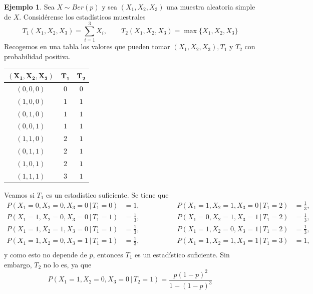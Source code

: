 \documentclass[11pt]{report}
\theoremstyle{definition}
\newtheorem{example}{Ejemplo}
\begin{document}
\begin{example}
Sea $X \sim Ber(p)$ y sea $(X_1,X_2,X_3)$ una muestra aleatoria simple de $X$. Considérense los estadísticos muestrales
\[T_1(X_1,X_2,X_3) = \sum_{i=1}^3 X_i, \qquad T_2(X_1,X_2,X_3) = \max\{X_1,X_2,X_3\}\]
Recogemos en una tabla los valores que pueden tomar $(X_1,X_2,X_3), T_1$ y $T_2$ con probabilidad positiva.

\begin{center}
\begin{tabular}{|c|c|c|}
\hline
     $\bm{(X_1,X_2,X_3)}$ & $\bm{T_1}$ & $\bm{T_2}$  \\ \hline
     $(0,0,0)$ & $0$ & $0$ \\
     $(1,0,0)$ & $1$ & $1$ \\
     $(0,1,0)$ & $1$ & $1$ \\
     $(0,0,1)$ & $1$ & $1$ \\
     $(1,1,0)$ & $2$ & $1$ \\
     $(0,1,1)$ & $2$ & $1$ \\
     $(1,0,1)$ & $2$ & $1$ \\
     $(1,1,1)$ & $3$ & $1$ \\ \hline
\end{tabular}
\end{center}

Veamos si $T_1$ es un estadístico suficiente. Se tiene que
\[
\begin{alignedat}{3}
    P(X_1=0,X_2=0,X_3=0 \, \big| \, T_1 = 0) &= 1,\phantom{\frac{1}{3}} & \qquad \qquad P(X_1=1,X_2=1,X_3=0 \, \big| \, T_1 = 2) &= \frac{1}{3}, \\[5pt]
    P(X_1=1,X_2=0,X_3=0 \, \big| \, T_1 = 1) &= \frac{1}{3}, & \qquad \qquad P(X_1=0,X_2=1,X_3=1 \, \big| \, T_1 = 2) &= \frac{1}{3}, \\[5pt]
    P(X_1=1,X_2=1,X_3=0 \, \big| \, T_1 = 1) &= \frac{1}{3}, & \qquad \qquad P(X_1=1,X_2=0,X_3=1 \, \big| \, T_1 = 2) &= \frac{1}{3}, \\[5pt]
    P(X_1=1,X_2=0,X_3=1 \, \big| \, T_1 = 1) &= \frac{1}{3}, & \qquad \qquad P(X_1=1,X_2=1,X_3=1 \, \big| \, T_1 = 3) &= 1,\phantom{\frac{1}{3}} \\[5pt]
\end{alignedat}
\]
y como esto no depende de $p$, entonces $T_1$ es un estadístico suficiente. Sin embargo, $T_2$ no lo es, ya que
\[P(X_1=1,X_2=0,X_3=0 \, \big| \, T_2 = 1) = \frac{p(1-p)^2}{1-(1-p)^3}\]
\end{example}
\end{document}
